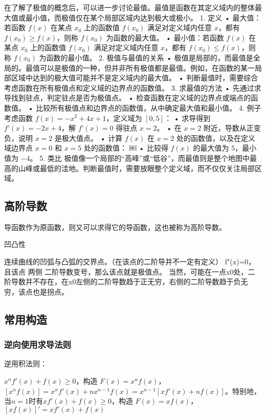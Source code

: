 在了解了极值的概念后，可以进一步讨论最值。最值是函数在其定义域内的整体最大值或最小值，而极值仅在某个局部区域内达到极大或极小。
	1.	定义
	•	最大值：若函数 $f(x)$ 在某点 $x_0$ 上的函数值 $f(x_0)$ 满足对定义域内任意 $x$，都有 $f(x_0) \geq f(x)$，则称 $f(x_0)$ 为函数的最大值。
	•	最小值：若函数 $f(x)$ 在某点 $x_0$ 上的函数值 $f(x_0)$ 满足对定义域内任意 $x$，都有 $f(x_0) \leq f(x)$，则称 $f(x_0)$ 为函数的最小值。
	2.	极值与最值的关系
	•	极值是局部的，而最值是全局的。最值可以是极值的一种，但并非所有极值都是最值。例如，在函数的某一局部区域中达到的极大值可能并不是定义域内的最大值。
	•	判断最值时，需要综合考虑函数在所有极值点和定义域的边界点的函数值。
	3.	求最值的方法
	•	先通过求导找到驻点，判定驻点是否为极值点。
	•	检查函数在定义域的边界点或端点的函数值。
	•	比较所有极值点和边界点的函数值，从中确定最大值和最小值。
	4.	例子
考虑函数 $f(x) = -x^2 + 4x + 1$，定义域为 $[0, 5]$：
	•	求导得到 $f’(x) = -2x + 4$，解 $f’(x) = 0$ 得驻点 $x = 2$。
	•	在 $x = 2$ 附近，导数从正变负，说明 $x = 2$ 是极大值点。
	•	计算 $f(x)$ 在 $x = 2$ 处的函数值，以及在定义域边界点 $x = 0$ 和 $x = 5$ 处的函数值：
￼
	•	比较得 $f(x)$ 的最大值为 $5$，最小值为 $-4$。
	5.	类比
极值像一个局部的“高峰”或“低谷”，而最值则是整个地图中最高的山峰或最低的洼地。判断最值时，需要放眼整个定义域，而不仅仅关注局部区域。


\subsection{高阶导数}

导函数作为原函数，则又可以求得它的导函数，这也被称为高阶导数。

凹凸性

连续曲线的凹弧与凸弧的交界点。（在该点的二阶导并不一定有定义）
f"(x)=0，且该点 两侧 二阶导数变号，那么该点就是极值点。
当然，可能在一点x0处，二阶导数并不存在，在x0左侧的二阶导数趋于正无穷，右侧的二阶导数趋于负无穷，该点也是拐点。

\subsection{常用构造}


\subsubsection{逆向使用求导法则}

逆用积法则：

$x^n f'(x) + f(x) \geq 0$，构造 $F(x) = x^n f(x)$，$[x^n f(x)] = x^n f'(x) + nx^{n-1} f(x) = x^{n-1} [x f'(x) + nf(x)]$。特别地，当$n=1$时有$x f'(x) + f(x) \geq 0$，构造 $F(x) = x f(x)$，$[x f(x)]' = x f'(x) + f(x)$

